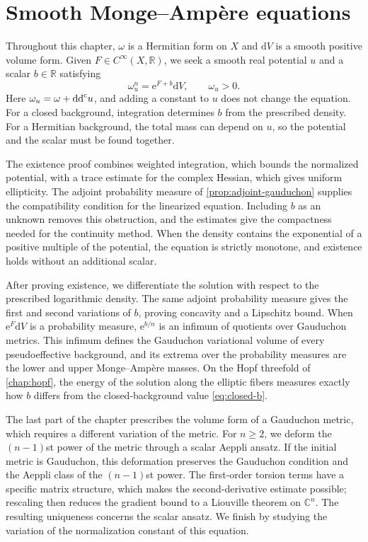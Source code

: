 \chapter{Smooth Monge--Amp\`ere equations}
\label{chap:smooth-equations}

Throughout this chapter, $\omega$ is a Hermitian form on $X$ and $\mathrm{d}V$ is a smooth positive volume form. Given $F\in C^\infty(X,\mathbb R)$, we seek a smooth real potential $u$ and a scalar $b\in\mathbb R$ satisfying
\begin{equation}\label{eq:smooth-ma}
 \omega_u^n=\mathrm{e}^{F+b}\mathrm{d}V,\qquad \omega_u>0.
\end{equation}
Here $\omega_u=\omega+\mathrm{dd}^{\mathrm{c}} u$, and adding a constant to $u$ does not change the equation. For a closed background, integration determines $b$ from the prescribed density. For a Hermitian background, the total mass can depend on $u$, so the potential and the scalar must be found together.

The existence proof combines weighted integration, which bounds the normalized potential, with a trace estimate for the complex Hessian, which gives uniform ellipticity. The adjoint probability measure of \cref{prop:adjoint-gauduchon} supplies the compatibility condition for the linearized equation. Including $b$ as an unknown removes this obstruction, and the estimates give the compactness needed for the continuity method. When the density contains the exponential of a positive multiple of the potential, the equation is strictly monotone, and existence holds without an additional scalar.

After proving existence, we differentiate the solution with respect to the prescribed logarithmic density. The same adjoint probability measure gives the first and second variations of $b$, proving concavity and a Lipschitz bound. When $\mathrm e^F\mathrm{d}V$ is a probability measure, $\mathrm e^{b/n}$ is an infimum of quotients over Gauduchon metrics. This infimum defines the Gauduchon variational volume of every pseudoeffective background, and its extrema over the probability measures are the lower and upper Monge--Amp\`ere masses. On the Hopf threefold of \cref{chap:hopf}, the energy of the solution along the elliptic fibers measures exactly how $b$ differs from the closed-background value \eqref{eq:closed-b}.

The last part of the chapter prescribes the volume form of a Gauduchon metric, which requires a different variation of the metric. For $n\geq2$, we deform the $(n-1)$st power of the metric through a scalar Aeppli ansatz. If the initial metric is Gauduchon, this deformation preserves the Gauduchon condition and the Aeppli class of the $(n-1)$st power. The first-order torsion terms have a specific matrix structure, which makes the second-derivative estimate possible; rescaling then reduces the gradient bound to a Liouville theorem on $\mathbb C^n$. The resulting uniqueness concerns the scalar ansatz. We finish by studying the variation of the normalization constant of this equation.

